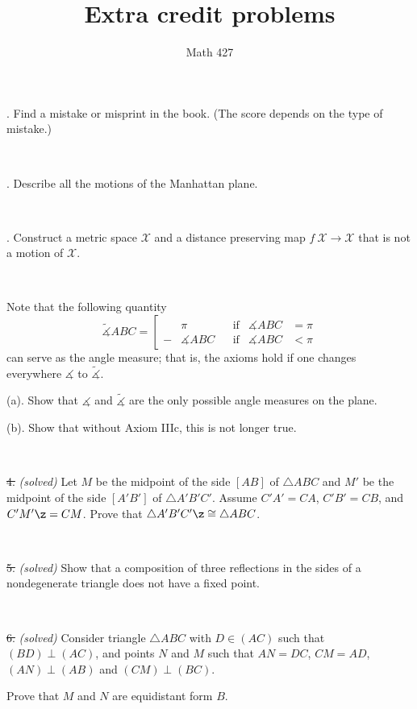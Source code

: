 \documentclass[oneside,a4paper]{article}
\begin{document}
\title{Extra credit problems}
\author{Math 427}
\date{}
\maketitle


. Find a mistake or misprint in the book.
(The score depends on the type of mistake.)

\ 

. Describe all the motions of the Manhattan plane.

\ 

. Construct a metric space $\mathcal X$ and a distance preserving map $f\:\mathcal X\to \mathcal X$ that is not a motion of $\mathcal X$.

\ 

 Note that the following quantity 
$$\tilde
\measuredangle ABC=\left[
\begin{aligned}
&\pi&&\text{if}&\measuredangle ABC&=\pi
\\
-&\measuredangle ABC&&\text{if}&\measuredangle ABC&<\pi
\end{aligned}
\right.$$
can serve as the angle measure; 
that is, the axioms hold if one changes everywhere $\measuredangle$ to $\tilde\measuredangle$.

\noi (a). Show that $\measuredangle$ and $\tilde\measuredangle$ are the only possible angle measures on the plane. 

\noi (b). Show that without Axiom IIIc, this is not longer true.

\ 

\noi \sout{4.} \textit{(solved)}
Let $M$ be the midpoint of the side $[A B]$ of $\triangle A B C$ and
$M'$ be the midpoint of the side $[A' B']$ of $\triangle A' B' C'$.
Assume $C' A'=C A$, $C' B'= C B$, and $C' M'\z= C M$.
Prove that $\triangle A' B' C'\z\cong\triangle A B C$.

\ 

\noi \sout{5.} \textit{(solved)}
Show that a composition of three reflections in the sides of a nondegenerate triangle does not have a fixed point.

\ 

\noi \sout{6.} \textit{(solved)} Consider triangle $\triangle A B C$ with $D\in (A C)$ such that $(BD)\perp (AC)$, and points $N$ and $M$ such that $AN=DC$, $CM=AD$, $(AN)\perp(AB)$ and $(CM)\perp(BC)$.

Prove that $M$ and $N$ are equidistant form $B$.
\end{document}
